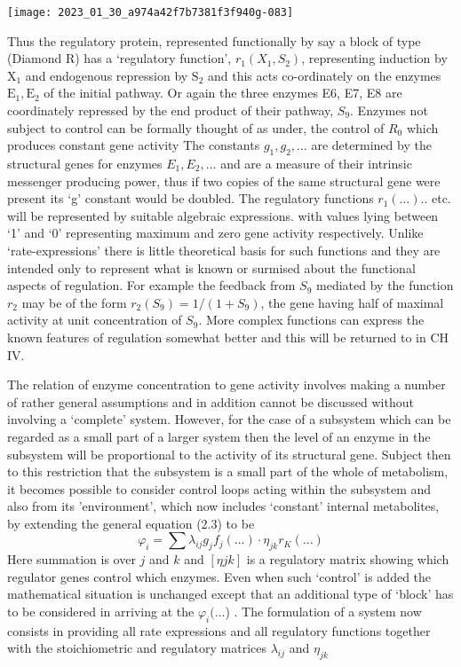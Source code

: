 \begin{center}
\texttt{[image: 2023\_01\_30\_a974a42f7b7381f3f940g-083]}
\end{center}

Thus the regulatory protein, represented functionally by say a block of type {(\color{red}Diamond R)} has a `regulatory function', $r_1 (X_1, S_2)$, representing induction by $\mathrm{X}_{1}$ and endogenous repression by $\mathrm{S}_{2}$ and this acts co-ordinately on the enzymes $\mathrm{E}_{1}, \mathrm{E}_{2}$ of the initial pathway. Or again the three enzymes E6, E7, E8 are coordinately repressed by the end product of their pathway, $S_{9}$. Enzymes not subject to control can be formally thought of as under, the control of $R_{0}$ which produces constant gene activity The constants $g_{1}, g_{2}, \ldots$ are determined by the structural genes for enzymes $E_{1}, E_{2}, \ldots$ and are a measure of their intrinsic messenger producing power, thus if two copies of the same structural gene were present its `g' constant would be doubled. The regulatory functions $r_{1}(\ldots)$.. etc. will be represented by suitable algebraic expressions. with values lying between `1' and `0' representing maximum and zero gene activity respectively. Unlike `rate-expressions' there is little theoretical basis for such functions and they are intended only to represent what is known or surmised about the functional aspects of regulation. For example the feedback from $S_{9}$ mediated by the function $r_{2}$ may be of the form $r_{2}\left(S_{9}\right)=1 /\left(1+S_9\right)$, the gene having half of maximal activity at unit concentration of $S_{9}$. More complex functions can express the known features of regulation somewhat better and this will be returned to in $\mathrm{CH}$ IV.

The relation of enzyme concentration to gene activity involves making a number of rather general assumptions and in addition cannot be discussed without involving a `complete' system. However, for the case of a subsystem which can be regarded as a small part of a larger system then the level of an enzyme in the subsystem will be proportional to the activity of its structural gene. Subject then to this restriction that the subsystem is a small part of the whole of metabolism, it becomes possible to consider control loops acting within the subsystem and also from its 'environment', which now includes `constant' internal metabolites, by extending the general equation (2.3) to be
%
\begin{equation}
\varphi_{i}=\sum \lambda_{ij} g_{j} f_{j}(\ldots) \cdot \eta_{jk} {r_{K}}(\ldots)
\label{eqn:29}
\end{equation}
%
Here summation is over $j$ and $k$ and $[\eta{jk}]$ is a regulatory matrix showing which regulator genes control which enzymes. Even when such `control' is added the mathematical situation is unchanged except that an additional type of `block' has to be considered in arriving at the $\varphi_{i}(\ldots$) . The formulation of a system now consists in providing all rate expressions and all regulatory functions together with the stoichiometric and regulatory matrices $\lambda_{ij}$ and $\eta_{jk}$

